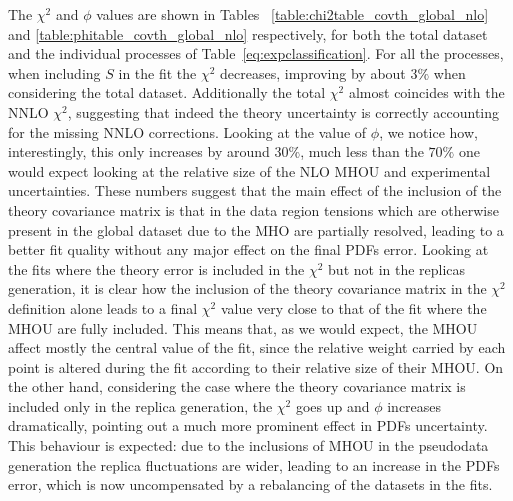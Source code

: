     The $\chi^2$ and $\phi$ values are shown in Tables ~\ref{table:chi2table_covth_global_nlo}
    and \ref{table:phitable_covth_global_nlo} respectively, for both the total dataset and the individual processes of 
    Table~\ref{eq:expclassification}.
    For all the processes, when including $S$ in the fit the $\chi^2$ decreases, improving
    by about $3\%$ when considering the total dataset. Additionally the total $\chi^2$ almost coincides with the NNLO 
    $\chi^2$, suggesting that indeed the theory uncertainty is correctly accounting for the missing NNLO corrections.
    Looking at the value of $\phi$, we notice how, interestingly, this only increases by around $30\%$, 
    much less than the $70\%$ one would expect looking at the relative size of the NLO MHOU and experimental uncertainties.
    These numbers suggest that the main effect of the inclusion of the theory covariance matrix is that
    in the data region tensions which are otherwise present in the global dataset due to the MHO are partially resolved,
    leading to a better fit quality without any major effect on the final PDFs error. 
    Looking at the fits where the theory error is included in the $\chi^2$ but not in the replicas generation,
    it is clear how the inclusion of the theory covariance matrix in the 
    $\chi^2$ definition alone leads to a final $\chi^2$ value very close to that of the fit where the MHOU are fully included.
    This means that, as we would expect, the MHOU affect mostly the central value of the fit,
    since the relative weight carried by each point is altered during the fit according to their relative size of their MHOU.
    On the other hand, considering the case where the theory covariance matrix is included only in the replica generation, 
    the $\chi^2$ goes up and $\phi$ increases dramatically, pointing out a much more prominent effect in PDFs uncertainty.
    This behaviour is expected: due to the inclusions of MHOU in the pseudodata generation the replica fluctuations are wider,
    leading to an increase in the PDFs error, which is now uncompensated by a rebalancing of the datasets in the fits.
      
     
    
